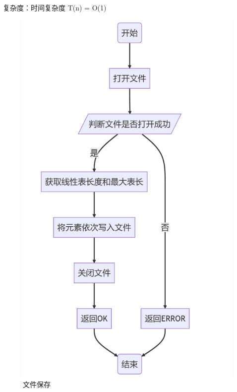 \documentclass[supercite]{Experimental_Report}
\theoremstyle{definition}
\begin{document}
\begin{enumerate}
	复杂度：时间复杂度 T(n) = O(1)
\begin{figure}[htbp]
	\centering
	\begin{minipage}{0.7\linewidth}
		\centering
		\includegraphics[width=0.9\linewidth]{images/文件保存.png}
	\end{minipage}
	\caption{文件保存}
	\label{fig2-5}
\end{figure}


\end{enumerate}
\end{document}
